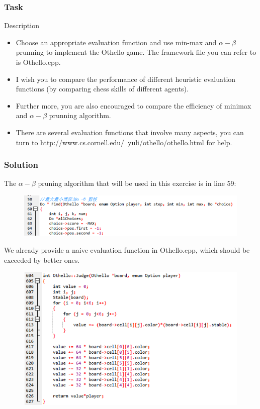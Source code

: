 \documentclass{beamer}
\begin{document}
\begin{frame}
  \frametitle{Task}
  \begin{block}{Description}
    \begin{itemize}
      \item Choose an appropriate evaluation function and use min-max and $\alpha - \beta$ prunning to implement the Othello game. The framework file you can refer to is Othello.cpp. 
\item I wish you to compare the performance of different heuristic evaluation functions (by comparing chess skills of different agents). 
\item Further more, you are also encouraged to compare the efficiency of minimax and $\alpha - \beta$ prunning algorithm.
	  \item There are several evaluation functions that involve many aspects, you can turn to http://www.cs.cornell.edu/~yuli/othello/othello.html for help.
    \end{itemize}
  \end{block}
\end{frame}

\begin{frame}
  \frametitle{Solution}
The $\alpha - \beta$ pruning algorithm that will be used in this exercise is in line 59:

    \begin{figure}[ht]
      \centering
      \includegraphics[width=1.0\textwidth]{Pic/algorithm}
    \end{figure}

	We already provide a naive evaluation function in Othello.cpp, which should be exceeded by better ones.
    \begin{figure}[ht]
      \centering
      \includegraphics[width=1.0\textwidth]{Pic/evalfunc}
    \end{figure}
\end{frame}
\end{document}
